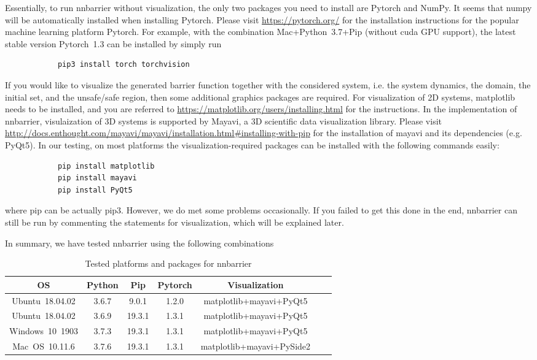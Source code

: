 \documentclass{llncs}
\begin{document}
Essentially, to run \textsf{nnbarrier} without visualization, the only two packages you need to install are \textsf{Pytorch} and \textsf{NumPy}.
It seems that \textsf{numpy} will be automatically installed when installing \textsf{Pytorch}. Please visit \url{https://pytorch.org/} for the 
installation instructions
for the popular machine learning platform \textsf{Pytorch}. For example, with the combination 
\textsf{Mac+Python~3.7+Pip} (without \textsf{cuda} GPU support), the latest stable version \textsf{Pytorch~1.3} can be installed by simply run 
\begin{verbatim}
            pip3 install torch torchvision\end{verbatim}

If you would like to visualize the generated barrier function together with the considered system, i.e. the system dynamics, the domain, the initial set, and the unsafe/safe region,
then some additional graphics packages are required. For visualization of 2D systems, \textsf{matplotlib} needs to be installed, and you are referred to
 \url{https://matplotlib.org/users/installing.html} for the instructions. In the implementation of \textsf{nnbarrier},
 visulaization of 3D systems is supported by \textsf{Mayavi}, a 3D scientific data visualization library. Please visit
 \url{http://docs.enthought.com/mayavi/mayavi/installation.html#installing-with-pip} for the installation of \textsf{mayavi} and 
 its dependencies (e.g. \textsf{PyQt5}). In our testing, on most platforms the visualization-required packages can be installed with the following commands easily:
\begin{verbatim}              
            pip install matplotlib
            pip install mayavi
            pip install PyQt5 \end{verbatim}
where \textsf{pip} can be actually \textsf{pip3}. However, we do met some problems occasionally. If you failed to
get this done in the end, \textsf{nnbarrier} can still be run by commenting the statements for visualization, which
will be explained later.  

In summary, we have tested \textsf{nnbarrier} using the following combinations
\begin{table}
    \centering
    \caption{Tested platforms and packages for \textsf{nnbarrier}}
    \label{tbl:platform}
	\begin{tabular}{|c|c|c|c|c|c|c|} 
		\hline OS                 & Python    & Pip      & Pytorch & Visualization \\ 
		\hline Ubuntu~18.04.02    & 3.6.7     & 9.0.1    & 1.2.0   & \textsf{matplotlib+mayavi+PyQt5}  \\ 
		\hline Ubuntu~18.04.02    & 3.6.9     & 19.3.1   & 1.3.1   & \textsf{matplotlib+mayavi+PyQt5}  \\ 
        \hline Windows~10~1903    & 3.7.3     & 19.3.1   & 1.3.1   & \textsf{matplotlib+mayavi+PyQt5}  \\
        \hline Mac~OS~10.11.6     & 3.7.6     & 19.3.1   & 1.3.1   & \textsf{matplotlib+mayavi+PySide2}  \\ 
		\hline
	\end{tabular}
\end{table}
\end{document}
